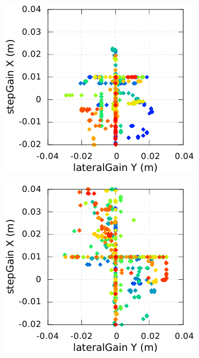 \begin{figure}[htbp]
\begin{subfigure}{0.22\paperwidth}
    \end{subfigure}
    \newline
    \begin{subfigure}{0.22\paperwidth}
        \centering
        \includegraphics[type=pdf,ext=.pdf,read=.pdf,width=1.0\linewidth]{../plot/OdometryLWPR/grass_open_learn_log_walk_orders}
    \end{subfigure}
    \begin{subfigure}{0.22\paperwidth}
        \centering
        \includegraphics[type=pdf,ext=.pdf,read=.pdf,width=1.0\linewidth]{../plot/OdometryLWPR/grass_close_learn_log_walk_orders}

\end{subfigure}
\end{figure}
